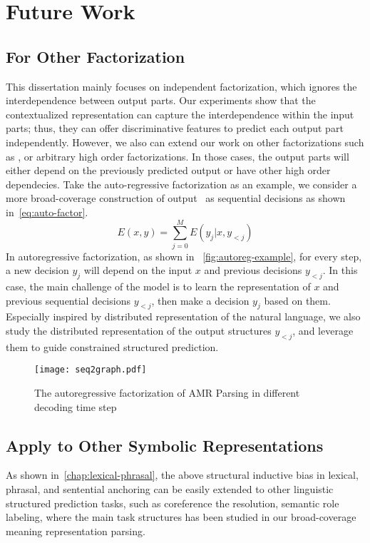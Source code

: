 \section{Future Work}
\label{sec:conclusions:future}

\subsection{For Other Factorization}
\label{ssec:future:other-factorization}

This dissertation mainly focuses on independent factorization, which ignores
the interdependence between output parts. Our experiments show that
the contextualized representation can capture the interdependence
within the input parts; thus, they can offer discriminative features
to predict each output part independently. However, we also can extend
our work on other factorizations such as , or arbitrary high order factorizations. In those
cases, the output parts will either depend on the previously predicted
output or have other high order dependecies. Take the auto-regressive
factorization as an example, we consider a more broad-coverage
construction of output \OUT~as sequential decisions as shown
in~\autoref{eq:auto-factor}.
\begin{equation}
  \label{eq:auto-factor}
E(x, y)=\sum_{j=0}^{M}E(y_{j}|x,y_{<j})
\end{equation}
In autoregressive factorization, as shown in
~\autoref{fig:autoreg-example}, for every step, a new decision $y_{j}$
will depend on the input $x$ and previous decisions $y_{<j}$. In this
case, the main challenge of the model is to learn the representation
of $x$ and previous sequential decisions $y_{<j}$, then make a
decision $y_{j}$ based on them.  Especially inspired by distributed
representation of the natural language, we also study the distributed
representation of the output structures $y_{<j}$, and leverage them to
guide constrained structured prediction.

\begin{figure}[h]
\centering
\texttt{[image: seq2graph.pdf]}
\caption{\label{fig:autoreg-example}The autoregressive factorization
  of AMR Parsing in different decoding time step}
\end{figure}

\subsection{Apply to Other Symbolic Representations}
\label{ssec:future:application}
As shown in~\autoref{chap:lexical-phrasal}, the above structural
inductive bias in lexical, phrasal, and sentential anchoring can be
easily extended to other linguistic structured prediction tasks, such
as coreference the resolution, semantic role labeling, where the main
task structures has been studied in our broad-coverage meaning
representation parsing.

